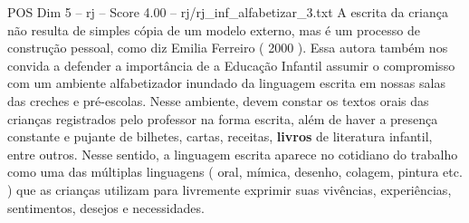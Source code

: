 \begin{textsample}{POS Dim 5 – rj – Score 4.00 – rj/rj\_inf\_alfabetizar\_3.txt}
A escrita da criança não resulta de simples cópia de um modelo externo, mas é um processo de construção pessoal, como diz Emilia Ferreiro ( 2000 ).
Essa autora também nos convida a defender a importância de a Educação Infantil assumir o compromisso com um ambiente alfabetizador inundado da linguagem escrita em nossas salas das creches e pré-escolas.
Nesse ambiente, devem constar os textos orais das crianças registrados pelo professor na forma escrita, além de haver a presença constante e pujante de bilhetes, cartas, receitas, \textbf{livros} de literatura infantil, entre outros.
Nesse sentido, a linguagem escrita aparece no cotidiano do trabalho como uma das múltiplas linguagens ( oral, mímica, desenho, colagem, pintura etc. ) que as crianças utilizam para livremente exprimir suas vivências, experiências, sentimentos, desejos e necessidades.

\end{textsample}
